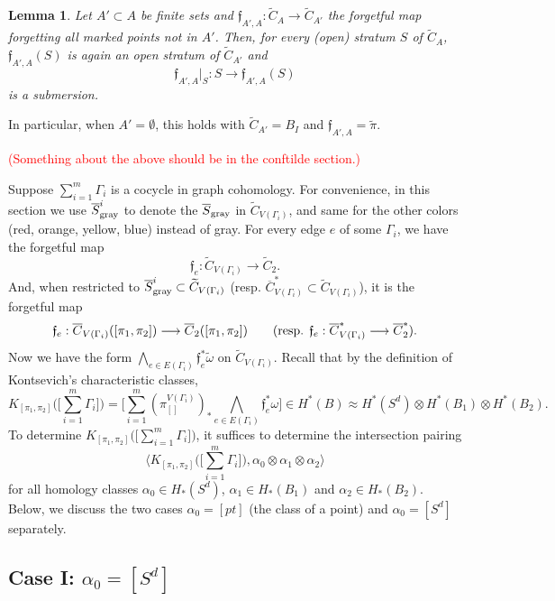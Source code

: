 \documentclass[11pt]{article}
\newtheorem{lmm}[thm]{Lemma}
\theoremstyle{definition}
\theoremstyle{remark}
\def\wt#1{\widetilde{#1}}
\def\ov#1{\overline{#1}}
\def\sgray{{\textnormal{gray}}}
\def\ff{\mathfrak{f}}
\def\cmt#1{\textcolor{red}{(#1)}}
\def\tn#1{\textnormal{#1}}
\begin{document}
\begin{lmm}\label{stratasubmersion_lmm}
Let $A'\subset A$ be finite sets and $\ff_{A',A}:\wt{C}_{A}\to\wt{C}_{A'}$ the forgetful map forgetting all marked points not in $A'$. 
Then, for every (open) stratum $S$ of $\wt{C}_{A}$, $\ff_{A',A}(S)$ is again an open stratum of $\wt{C}_{A'}$ and 
$$\ff_{A',A}|_S:S\longrightarrow \ff_{A',A}(S)$$
is a submersion. 
\end{lmm}

In particular, when $A'=\emptyset$, this holds with $\wt{C}_{A'}=B_I$ and $\ff_{A',A}=\tilde{\pi}$. 

\cmt{Something about the above should be in the conftilde section.}


Suppose $\sum_{i=1}^{m}\Gamma_i$ is a cocycle in graph cohomology. 
For convenience, in this section we use $\ov{S}_{\sgray}^i$ to denote the $\ov{S}_{\sgray}$ in $\wt{C}_{V(\Gamma_i)}$, and same for the other colors (red, orange, yellow, blue) instead of gray.
For every edge $e$ of some $\Gamma_i$, we have the forgetful map 
$$\ff_e:\wt{C}_{V(\Gamma_i)}\longrightarrow\wt{C}_2.$$
And, when restricted to $\ov{S}_{\sgray}^i\subset\wt{C}_{V(\Gamma_i)}$ (resp. $\ov{C}_{V(\Gamma_i)}^*\subset\wt{C}_{V(\Gamma_i)}$), it is the forgetful map
$$\ff_e:\ov{C}_{V(\Gamma_i)}([\pi_1,\pi_2])\longrightarrow\ov{C}_2([\pi_1,\pi_2]) \qquad (\tn{resp. } \ff_e:\ov{C}^*_{V(\Gamma_i)}\longrightarrow\ov{C}^*_2).$$
Now we have the form $\bigwedge_{e\in E(\Gamma_i)}\ff_e^*\wt{\omega}$ on $\wt{C}_{V(\Gamma_i)}$. 
Recall that by the definition of Kontsevich's characteristic classes, 
$$K_{[\pi_1,\pi_2]}\big(\big[\sum_{i=1}^m\Gamma_i\big]\big)=
\big[\sum_{i=1}^m (\pi_{[]}^{V(\Gamma_i)})_*\bigwedge_{e\in E(\Gamma_i)}\ff_e^*{\omega}\big]\in H^*(B)\approx H^*(S^d)\otimes H^*(B_1)\otimes H^*(B_2).
$$
To determine $K_{[\pi_1,\pi_2]}\big(\big[\sum_{i=1}^m\Gamma_i\big]\big)$, it suffices to determine the intersection pairing 
$$\big\langle K_{[\pi_1,\pi_2]}\big(\big[\sum_{i=1}^m\Gamma_i\big]\big), \alpha_0\otimes\alpha_1\otimes\alpha_2\big\rangle$$
for all homology classes $\alpha_0\in H_*(S^d)$, $\alpha_1\in H_*(B_1)$ and $\alpha_2\in H_*(B_2)$. 
Below, we discuss the two cases $\alpha_0=[pt]$ (the class of a point) and $\alpha_0=[S^d]$ separately. 

\subsection*{Case I: $\alpha_0=[S^d]$}
\end{document}
